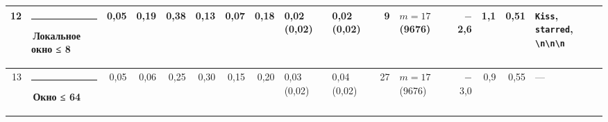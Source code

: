 \documentclass[10pt]{article}
\begin{document}
\begin{minipage}{\linewidth}
\begin{center}
{\begin{tabular}{|r|l|r|r|r|r|r|r|l|l|r|l|r|r|r|l|}
12 & \textcolor[HTML]{1BAF7A}{\rule{0.62em}{0.62em}}\,\textbf{Локальное окно ≤ 8} & 0,05 & 0,19 & 0,38 & 0,13 & 0,07 & 0,18 & 0,02 (0,02) & 0,02 (0,02) & 9 & $m{=}17$ (9676) & $-$2,6 & 1,1 & 0,51 & \texttt{\textvisiblespace{}Kiss}, \texttt{\textvisiblespace{}starred}, \texttt{\textvisiblespace{}\textbackslash{}n\textbackslash{}n\textbackslash{}n} \\ \hline
13 & \textcolor[HTML]{EDA100}{\rule{0.62em}{0.62em}}\,\textbf{Окно ≤ 64} & 0,05 & 0,06 & 0,25 & 0,30 & 0,15 & 0,20 & 0,03 (0,02) & 0,04 (0,02) & 27 & $m{=}17$ (9676) & $-$3,0 & 0,9 & 0,55 & — \\ \hline
\hline\end{tabular}}\end{center}
\end{minipage}
\par\vspace{0.4em}
\end{document}
